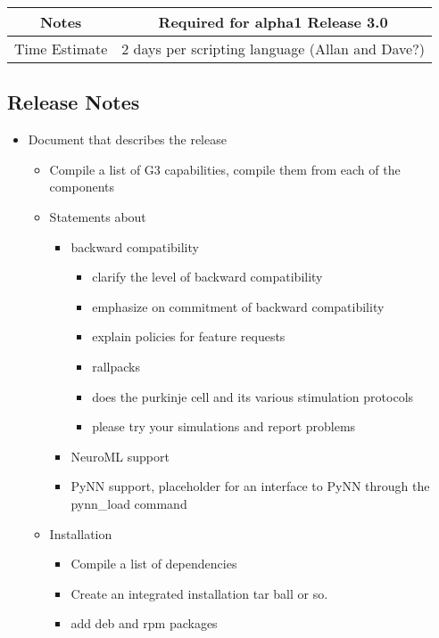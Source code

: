 \documentclass[12pt]{article}
\begin{document}
{
  \vspace{5mm}
  \centering
  \begin{tabular}{|c|c|}
    \hline
    Notes
    & Required for alpha1 Release 3.0 \\
    \hline
    Time Estimate
    & 2 days per scripting language (Allan and Dave?) \\
    \hline
  \end{tabular}
}


\subsection{Release Notes}

\begin{itemize}
\item Document that describes the release
  \begin{itemize}
  \item Compile a list of G3 capabilities, compile them from each of the components
  \item Statements about
    \begin{itemize}
    \item backward compatibility
      \begin{itemize}
      \item clarify the level of backward compatibility 
      \item emphasize on commitment of backward compatibility
      \item explain policies for feature requests
      \item rallpacks
      \item does the purkinje cell and its various stimulation protocols
      \item please try your simulations and report problems
      \end{itemize}
    \item NeuroML support
    \item PyNN support, placeholder for an interface to PyNN through the
      pynn\_load command
    \end{itemize}
  \item Installation
    \begin{itemize}
    \item Compile a list of dependencies
    \item Create an integrated installation tar ball or so.
    \item add deb and rpm packages

\end{itemize}
\end{itemize}
\end{itemize}
\end{document}
